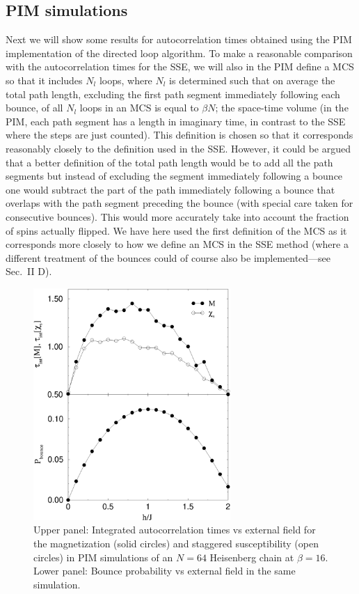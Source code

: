 \documentclass[10pt,pre,aps,twocolumn,showpacs,superscriptaddress,
floatfix]{revtex4}
\begin{document}
\subsection{PIM simulations}

Next we will show some results for autocorrelation times obtained using the 
PIM implementation of the directed loop algorithm. To make a reasonable 
comparison with the autocorrelation times for the SSE, we will also in the 
PIM define a MCS so that it includes $N_l$ loops, where $N_l$ is determined 
such that on average the total path length, excluding the first path segment 
immediately following each bounce, of all $N_l$ loops in an MCS is equal to 
$\beta N$; the space-time volume (in the PIM, each path segment has a length
in imaginary time, in contrast to the SSE where the steps are just 
counted). This definition is chosen so that it corresponds reasonably closely 
to the definition used in the SSE. However, it could be argued that a better 
definition of the total path length would be to add all the path segments
but instead of excluding the segment immediately following a bounce one 
would subtract the part of the path immediately following a bounce that
overlaps with the path segment preceding the bounce (with special care 
taken for consecutive bounces). This would more 
accurately take into account the fraction of spins actually flipped. We have 
here used the first definition of the MCS as it corresponds more closely 
to how we define an MCS in the SSE method (where a different treatment of the 
bounces could of course also be implemented---see Sec.~II D). 

\begin{figure}
\includegraphics[clip,width=7.5cm]{fig23.eps}
\caption{Upper panel: Integrated autocorrelation times vs external field for 
the magnetization (solid circles) and staggered susceptibility (open circles) 
in PIM simulations of an $N=64$ Heisenberg chain at $\beta=16$. 
Lower panel: Bounce probability vs external field in the same simulation.} 
\label{pim_n64}
\end{figure}
 
\end{document}
